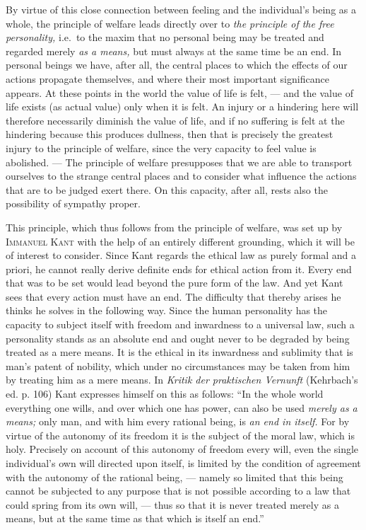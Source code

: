 \documentclass[12pt,a4paper,openany]{book}
\newcommand{\opage}[1]{\marginnote{\footnotesize\textit{[#1]}}}
\begin{document}
\opage{174}By virtue of this close connection between feeling and the individual's being as a whole, the
principle of welfare leads directly over to \textit{the principle of the free personality,} i.e.\ to the
maxim that no personal being may be treated and regarded merely \textit{as a means,} but must always at the
same time be an end. In personal beings we have, after all, the central places to which the effects of our
actions propagate themselves, and where their most important significance appears. At these points in the
world the value of life is felt, --- and the value of life exists (as actual value) only when it is felt. An
injury or a hindering here will therefore necessarily diminish the value of life, and if no suffering is felt
at the hindering because this produces dullness, then that is precisely the greatest injury to the principle
of welfare, since the very capacity to feel value is abolished. --- The principle of welfare presupposes that
we are able to transport ourselves to the strange central places and to consider what influence the actions
that are to be judged exert there. On this capacity, after all, rests also the possibility of sympathy proper.

This principle, which thus follows from the principle of welfare, was set up by \textsc{Immanuel Kant} with the
help of an entirely different grounding, which it will be of interest to consider. Since Kant regards the
ethical law as purely formal and a priori, he cannot really derive definite ends for ethical action from it.
Every end that was to be set would lead beyond the pure form of the law. And yet Kant sees that every action
must have an end. The difficulty that thereby arises he thinks he solves in the following way. Since the human
personality has the capacity to subject itself with freedom and inwardness to a universal law, such a
personality stands as an absolute end and ought never to be degraded by being treated as a mere means. It is
the ethical in its inwardness and sublimity that is man's patent of nobility, which under no circumstances may
be taken from him by treating him as a mere means. In \textit{Kritik der praktischen Vernunft} (Kehrbach's ed.
p. 106) Kant expresses himself on this as follows: ``In the whole world everything one wills, and over which
one has power, can also be used \textit{merely as a means;} only man, and with him every
\opage{175}rational being, is \textit{an end in itself.} For by virtue of the autonomy of its freedom it is the
subject of the moral law, which is holy. Precisely on account of this autonomy of freedom every will, even the
single individual's own will directed upon itself, is limited by the condition of agreement with the autonomy of
the rational being, --- namely so limited that this being cannot be subjected to any purpose that is not
possible according to a law that could spring from its own will, --- thus so that it is never treated merely as
a means, but at the same time as that which is itself an end.''
\end{document}
